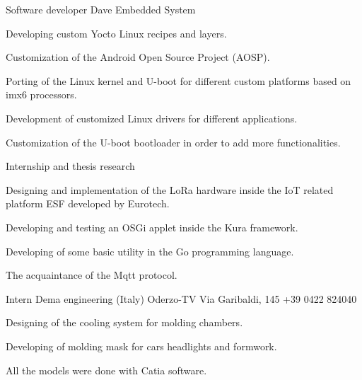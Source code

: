 \documentclass[english,a4paper]{europasscv}
\begin{document}
\begin{europasscv}


		 {
			Software developer Dave Embedded System
		}
		\ecvitem{} {
			\begin{ecvitemize}
				\item Developing custom Yocto Linux recipes and layers.
				\item Customization of the Android Open Source Project (AOSP).
				\item Porting of the Linux kernel and U-boot for different custom
					platforms based on imx6 processors.
				\item Development of customized Linux drivers for different
					applications.
				\item Customization of the U-boot bootloader in order to add
					more functionalities.
			\end{ecvitemize}
		}

		 {
			Internship and thesis research
		}
		\ecvitem{} {
			\begin{ecvitemize}
					\item Designing and implementation of the LoRa hardware
						inside the IoT related platform ESF developed by Eurotech.
					\item Developing and testing an OSGi applet inside the Kura
						framework.
					\item Developing of some basic utility in the Go programming
						language.
					\item The acquaintance of the Mqtt protocol.
			\end{ecvitemize}
		}

		 {
			Intern
		}
		\ecvitem{} {
			Dema engineering (Italy) Oderzo-TV Via Garibaldi,
			145 \newline +39 0422 824040
		}
		\ecvitem{} {
			\begin{ecvitemize}
				\item Designing of the cooling system for molding chambers.
				\item Developing of molding mask for cars headlights and formwork.
				\item All the models were done with Catia software.
			\end{ecvitemize}
		}


\end{europasscv}
\end{document}
